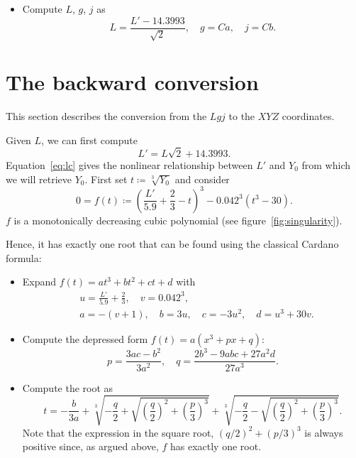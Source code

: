 \documentclass{scrartcl}
\theoremstyle{named}
\begin{document}
\begin{itemize}
  \item Compute $L$, $g$, $j$ as
    \[
      L = \frac{L' - 14.3993}{\sqrt{2}},\quad g = Ca,\quad j = Cb.
    \]
\end{itemize}

\section{The backward conversion}

This section describes the conversion from the  $Lgj$ to the $XYZ$ coordinates.

Given $L$, we can first compute
\[
  L' = L \sqrt{2} + 14.3993.
\]
Equation~\eqref{eq:lc} gives the nonlinear relationship between $L'$ and $Y_0$ from
which we will retrieve $Y_0$. First set $t\coloneqq \sqrt[3]{Y_0}$ and consider
\begin{equation}\label{eq:f}
  0 = f(t) \coloneqq {\left(\frac{L'}{5.9} + \frac{2}{3} - t\right)}^3 - 0.042^3 (t^3 - 30).
\end{equation}
$f$ is a monotonically decreasing cubic polynomial (see figure~\ref{fig:singularity}).

Hence, it has exactly one root that can be found using the classical Cardano formula:

\begin{itemize}
  \item Expand $f(t) = at^3 + bt^2 + ct + d$ with
    \[
      \begin{split}
        &u = \frac{L'}{5.9} + \frac{2}{3},\quad v = 0.042^3,\\
        &a = -(v + 1),\quad  b = 3u,\quad  c = -3u^2, \quad d = u^3 + 30v.
      \end{split}
    \]

  \item Compute the depressed form $f(t)=a(x^3 + px + q)$:
    \[
      p = \frac{3ac - b^2}{3a^2},\quad q = \frac{2b^3 - 9abc + 27a^2d}{27a^3}.
    \]

  \item Compute the root as
    \[
      t = -\frac{b}{3a} + \sqrt[3]{
        -\frac{q}{2} + \sqrt{{\left(\frac{q}{2}\right)}^2 + {\left(\frac{p}{3}\right)}^3}
      }
      + \sqrt[3]{
        -\frac{q}{2} - \sqrt{{\left(\frac{q}{2}\right)}^2 + {\left(\frac{p}{3}\right)}^3}
      }.
    \]
    Note that the expression in the square root, ${\left(q/2\right)}^2 +
    {\left(p/3\right)}^3$ is always positive since, as argued above, $f$ has
    exactly one root.
\end{itemize}
\end{document}
